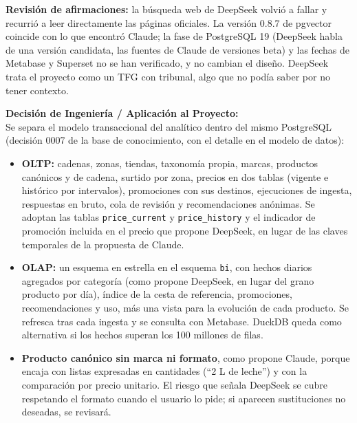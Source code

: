 \textbf{Revisión de afirmaciones:} la búsqueda web de DeepSeek volvió a fallar y recurrió a leer directamente las páginas oficiales. La versión 0.8.7 de pgvector coincide con lo que encontró Claude; la fase de PostgreSQL 19 (DeepSeek habla de una versión candidata, las fuentes de Claude de versiones beta) y las fechas de Metabase y Superset no se han verificado, y no cambian el diseño. DeepSeek trata el proyecto como un TFG con tribunal, algo que no podía saber por no tener contexto.

\textbf{Decisión de Ingeniería / Aplicación al Proyecto:} \\
Se separa el modelo transaccional del analítico dentro del mismo PostgreSQL (decisión 0007 de la base de conocimiento, con el detalle en el modelo de datos):

\begin{itemize}
	\item \textbf{OLTP:} cadenas, zonas, tiendas, taxonomía propia, marcas, productos canónicos y de cadena, surtido por zona, precios en dos tablas (vigente e histórico por intervalos), promociones con sus destinos, ejecuciones de ingesta, respuestas en bruto, cola de revisión y recomendaciones anónimas. Se adoptan las tablas \texttt{price\_current} y \texttt{price\_history} y el indicador de promoción incluida en el precio que propone DeepSeek, en lugar de las claves temporales de la propuesta de Claude.
	\item \textbf{OLAP:} un esquema en estrella en el esquema \texttt{bi}, con hechos diarios agregados por categoría (como propone DeepSeek, en lugar del grano producto por día), índice de la cesta de referencia, promociones, recomendaciones y uso, más una vista para la evolución de cada producto. Se refresca tras cada ingesta y se consulta con Metabase. DuckDB queda como alternativa si los hechos superan los 100 millones de filas.
	\item \textbf{Producto canónico sin marca ni formato}, como propone Claude, porque encaja con listas expresadas en cantidades (``2 L de leche'') y con la comparación por precio unitario. El riesgo que señala DeepSeek se cubre respetando el formato cuando el usuario lo pide; si aparecen sustituciones no deseadas, se revisará.
\end{itemize}

\vspace{0.5cm}

